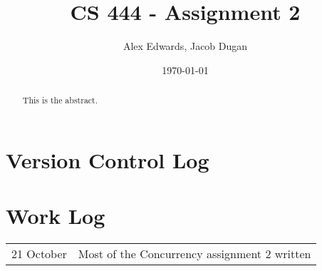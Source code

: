 \documentclass[letterpaper,10pt]{article}
\title{CS 444 - Assignment 2}
\author{Alex Edwards, Jacob Dugan}
\date{\today}
\begin{document}
\begin{titlepage}
\maketitle
\begin{abstract}
	This is the abstract.
\end{abstract}
\end{titlepage}

\section{Version Control Log}

\section{Work Log}
\begin{tabular}{l l}
	21 October & Most of the Concurrency assignment 2 written \\
\end{tabular}
\end{document}

